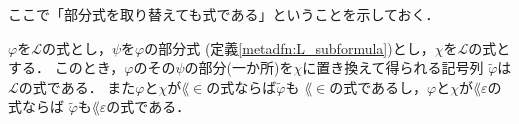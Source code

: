 	ここで「部分式を取り替えても式である」ということを示しておく．
	
	\begin{screen}
		\begin{metathm}[部分式を取り替えても式]
		\label{metathm:replace_subformula_with_some_formula}
			$\varphi$を$\mathcal{L}$の式とし，$\psi$を$\varphi$の部分式
			(定義\ref{metadfn:L_subformula})とし，$\chi$を$\mathcal{L}$の式とする．
			このとき，$\varphi$のその$\psi$の部分(一か所)を$\chi$に置き換えて得られる記号列
			$\widetilde{\varphi}$は$\mathcal{L}$の式である．
			また$\varphi$と$\chi$が$\lang{\in}$の式ならば$\widetilde{\varphi}$も
			$\lang{\in}$の式であるし，$\varphi$と$\chi$が$\lang{\varepsilon}$の式ならば
			$\widetilde{\varphi}$も$\lang{\varepsilon}$の式である．
		\end{metathm}
	\end{screen}
	
